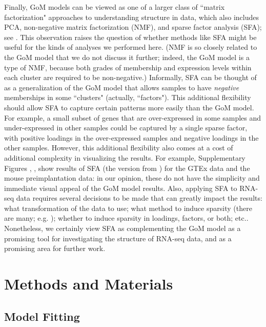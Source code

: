 \documentclass[10pt,letterpaper]{article}
\begin{document}
Finally, GoM models can be viewed as one of a larger class of ``matrix factorization" approaches to understanding structure in data, which also includes PCA, non-negative matrix factorization (NMF), and sparse factor analysis (SFA); see \cite{Engelhardt2010}. This observation raises the question of whether methods like SFA might be useful for the kinds of analyses we performed here. (NMF is so closely related to the GoM model that we do not discuss it further;
indeed, the GoM model is a type of NMF, because both grades of membership and expression levels within each cluster are required to be non-negative.)
Informally, SFA can be thought of as a generalization of the GoM model that allows samples to have {\it negative} memberships in some ``clusters" (actually, ``factors").
This additional flexibility should allow SFA to capture certain patterns more easily than the GoM model. For example, a small subset of genes that are over-expressed in some samples and under-expressed in other samples could be captured by a single sparse factor, with positive loadings in the over-expressed samples and negative loadings in the other samples. However, this additional flexibility also comes at a cost of additional complexity in visualizing the results. For example, Supplementary Figures , ,  show results of SFA (the version from \cite{Engelhardt2010}) for the GTEx data and the mouse preimplantation data: in our opinion, these do not have the
simplicity and immediate visual appeal of the GoM model results. Also, applying SFA to RNA-seq data requires
several decisions to be made that can greatly impact the results: what transformation of the data to use; what method to induce sparsity (there are many; e.g. \cite{west, dunson, engelhardt, witten});  whether to induce sparsity in loadings, factors, or both; etc.. Nonetheless, we certainly view SFA as complementing the GoM model as a promising
tool for investigating the structure of RNA-seq data, and as a promising area for further work.





\section*{Methods and Materials}

\subsection*{Model Fitting}
\end{document}
